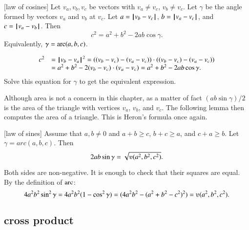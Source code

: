 \begin{lemma}[law of cosines]
Let $v_a,v_b,v_c$ be vectors with $v_a\ne v_c$, $v_b\ne v_c$.
    Let $\gamma$ be the angle formed by vectors $v_a$ and $v_b$ at $v_c$.  Let $a
    = {\hskip0.1em|\hskip-0.15em|\hskip0.1em}v_b  -  v_c{\hskip0.1em|\hskip-0.15em|\hskip0.1em}$, $b = {\hskip0.1em|\hskip-0.15em|\hskip0.1em}v_a  -  v_c{\hskip0.1em|\hskip-0.15em|\hskip0.1em}$, and $c = {\hskip0.1em|\hskip-0.15em|\hskip0.1em}v_a  -  v_b{\hskip0.1em|\hskip-0.15em|\hskip0.1em}$.  Then
        $$c^2 = a^2 + b^2 - 2 a b \cos\gamma.$$
Equivalently, $\gamma = \operatorname{arc}(a,b,c)$.

\end{lemma}
\begin{proved}
    $$\begin{array}{lll}c^2 &= {\hskip0.1em|\hskip-0.15em|\hskip0.1em}v_b  -  v_a{\hskip0.1em|\hskip-0.15em|\hskip0.1em}^2 = ((v_b - v_c) - (v_a - v_c))\cdot ((v_b - v_c) - (v_a -
    v_c)) \\ &= a^2 + b^2 - 2 (v_b - v_c)\cdot (v_a - v_c) = a^2 +b ^2 - 2 a b
    \cos\gamma.
    \end{array}$$
    Solve this equation for $\gamma$ to get the equivalent expression. 
\swallowed\end{proved}

Although area is not a concern in this chapter, as a matter of fact
$(a b \sin\gamma)/2$ is the area of the
triangle with vertices $v_a$, $v_b$, and $v_c$.  The following
lemma then computes the area of a triangle.  This is Heron's formula
once again.

\begin{lemma}[law of sines]
Assume that $a,b\ne 0$ and $a+b\ge c$, $b+c\ge a$, and $c+a\ge b$.
Let $\gamma=arc(a,b,c)$.  Then
        $$2 a b \sin\gamma = \sqrt{\ups(a^2,b^2,c^2)}.$$
\end{lemma}
\begin{proved}
Both sides are non-negative.  It is enough to check
that their squares are equal.  By the definition of $\operatorname{arc}$:
      $$4 a^2 b^2 \sin^2\gamma = 4 a^2 b^2 (1-\cos^2\gamma) = (4 a^2 b^2 - (a^2 + b^2 -
      c^2)^2) = \ups(a^2,b^2,c^2).$$
\swallowed\end{proved}




\subsection{cross product}%

